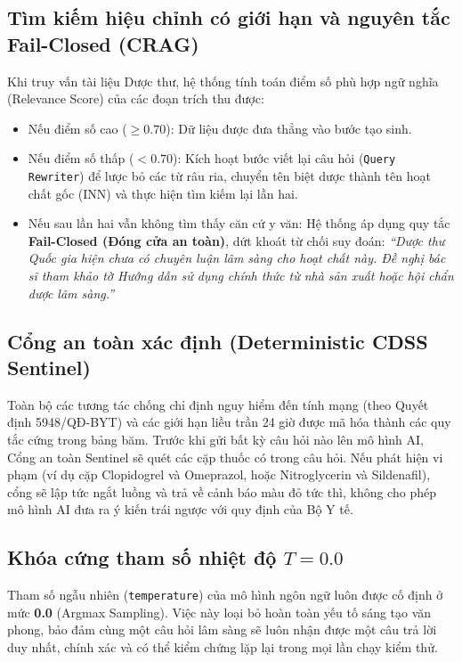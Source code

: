 \documentclass[12pt,a4paper]{article}
\begin{document}
\subsection{Tìm kiếm hiệu chỉnh có giới hạn và nguyên tắc Fail-Closed (CRAG)}
Khi truy vấn tài liệu Dược thư, hệ thống tính toán điểm số phù hợp ngữ nghĩa (Relevance Score) của các đoạn trích thu được:
\begin{itemize}[leftmargin=1.5em]
    \item Nếu điểm số cao ($\ge 0.70$): Dữ liệu được đưa thẳng vào bước tạo sinh.
    \item Nếu điểm số thấp ($< 0.70$): Kích hoạt bước viết lại câu hỏi (\texttt{Query Rewriter}) để lược bỏ các từ râu ria, chuyển tên biệt dược thành tên hoạt chất gốc (INN) và thực hiện tìm kiếm lại lần hai.
    \item Nếu sau lần hai vẫn không tìm thấy căn cứ y văn: Hệ thống áp dụng quy tắc \textbf{Fail-Closed (Đóng cửa an toàn)}, dứt khoát từ chối suy đoán: \textit{``Dược thư Quốc gia hiện chưa có chuyên luận lâm sàng cho hoạt chất này. Đề nghị bác sĩ tham khảo tờ Hướng dẫn sử dụng chính thức từ nhà sản xuất hoặc hội chẩn dược lâm sàng.''}
\end{itemize}

\subsection{Cổng an toàn xác định (Deterministic CDSS Sentinel)}
Toàn bộ các tương tác chống chỉ định nguy hiểm đến tính mạng (theo Quyết định 5948/QĐ-BYT) và các giới hạn liều trần 24 giờ được mã hóa thành các quy tắc cứng trong bảng băm. Trước khi gửi bất kỳ câu hỏi nào lên mô hình AI, Cổng an toàn Sentinel sẽ quét các cặp thuốc có trong câu hỏi. Nếu phát hiện vi phạm (ví dụ cặp Clopidogrel và Omeprazol, hoặc Nitroglycerin và Sildenafil), cổng sẽ lập tức ngắt luồng và trả về cảnh báo màu đỏ tức thì, không cho phép mô hình AI đưa ra ý kiến trái ngược với quy định của Bộ Y tế.

\subsection{Khóa cứng tham số nhiệt độ \texorpdfstring{$T = 0.0$}{T = 0.0}}
Tham số ngẫu nhiên (\texttt{temperature}) của mô hình ngôn ngữ luôn được cố định ở mức \textbf{0.0} (Argmax Sampling). Việc này loại bỏ hoàn toàn yếu tố sáng tạo văn phong, bảo đảm cùng một câu hỏi lâm sàng sẽ luôn nhận được một câu trả lời duy nhất, chính xác và có thể kiểm chứng lặp lại trong mọi lần chạy kiểm thử.
\end{document}
